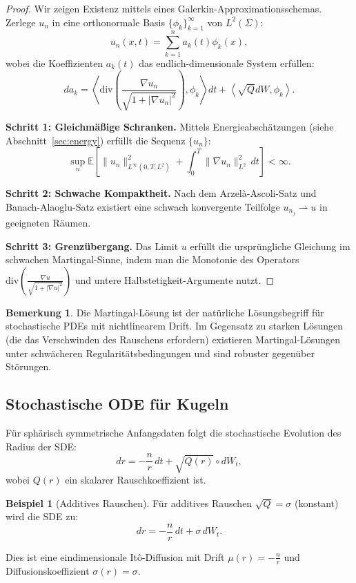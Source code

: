 \documentclass[a4paper,12pt]{article}
\theoremstyle{definition}
\newtheorem{beispiel}{Beispiel}
\newtheorem{bemerkung}{Bemerkung}
\begin{document}
\begin{proof}
	Wir zeigen Existenz mittels eines Galerkin-Approximationsschemas. Zerlege $u_n$ in eine orthonormale Basis $\{\phi_k\}_{k=1}^\infty$ von $L^2(\Sigma)$:
	\[
	u_n(x,t) = \sum_{k=1}^n a_k(t) \phi_k(x),
	\]
	wobei die Koeffizienten $a_k(t)$ das endlich-dimensionale System erfüllen:
	\[
	da_k = \left\langle \text{div}\left(\frac{\nabla u_n}{\sqrt{1+|\nabla u_n|^2}}\right), \phi_k \right\rangle dt + \left\langle \sqrt{Q} dW, \phi_k \right\rangle.
	\]
	
	\textbf{Schritt 1: Gleichmäßige Schranken.} Mittels Energieabschätzungen (siehe Abschnitt~\ref{sec:energy}) erfüllt die Sequenz $\{u_n\}$:
	\[
	\sup_{n} \mathbb{E}\left[\|u_n\|_{L^\infty(0,T;L^2)}^2 + \int_0^T \|\nabla u_n\|_{L^2}^2 \, dt\right] < \infty.
	\]
	
	\textbf{Schritt 2: Schwache Kompaktheit.} Nach dem Arzelà-Ascoli-Satz und Banach-Alaoglu-Satz existiert eine schwach konvergente Teilfolge $u_{n_j} \rightharpoonup u$ in geeigneten Räumen.
	
	\textbf{Schritt 3: Grenzübergang.} Das Limit $u$ erfüllt die ursprüngliche Gleichung im schwachen Martingal-Sinne, indem man die Monotonie des Operators $\text{div}(\frac{\nabla u}{\sqrt{1+|\nabla u|^2}})$ und untere Halbstetigkeit-Argumente nutzt.
\end{proof}

\begin{bemerkung}
	Die Martingal-Lösung ist der natürliche Lösungsbegriff für stochastische PDEs mit nichtlinearem Drift. Im Gegensatz zu starken Lösungen (die das Verschwinden des Rauschens erfordern) existieren Martingal-Lösungen unter schwächeren Regularitätsbedingungen und sind robuster gegenüber Störungen.
\end{bemerkung}

\subsection{Stochastische ODE für Kugeln}

Für sphärisch symmetrische Anfangsdaten folgt die stochastische Evolution des Radius der SDE:
\begin{equation}
\label{eq:sphere_sde}
dr = -\frac{n}{r} \, dt + \sqrt{Q(r)} \circ dW_t,
\end{equation}
wobei $Q(r)$ ein skalarer Rauschkoeffizient ist.

\begin{beispiel}[Additives Rauschen]
	Für additives Rauschen $\sqrt{Q} = \sigma$ (konstant) wird die SDE zu:
	\[
	dr = -\frac{n}{r} \, dt + \sigma \, dW_t.
	\]
	
	Dies ist eine eindimensionale Itô-Diffusion mit Drift $\mu(r) = -\frac{n}{r}$ und Diffusionskoeffizient $\sigma(r) = \sigma$.
\end{beispiel}
\end{document}
